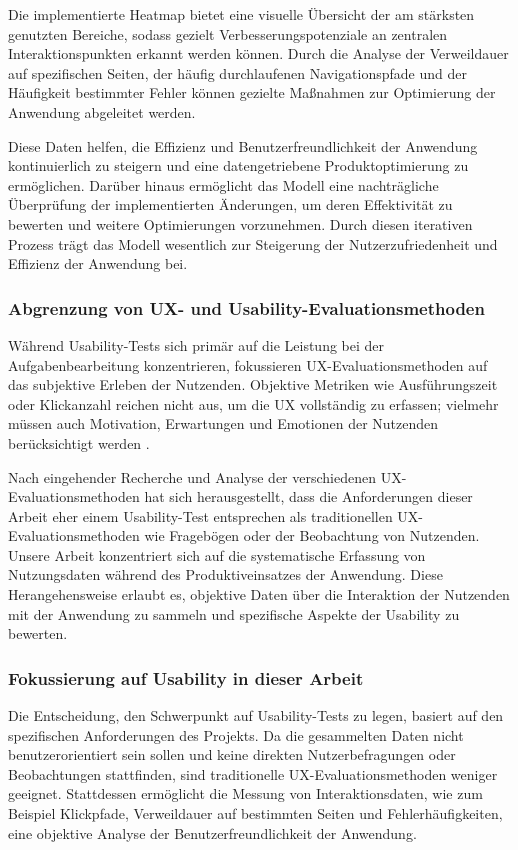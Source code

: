 \documentclass[12pt,oneside]{article}
\begin{document}
Die implementierte Heatmap bietet eine visuelle Übersicht der am stärksten genutzten Bereiche, sodass gezielt Verbesserungspotenziale an zentralen Interaktionspunkten erkannt werden können. Durch die Analyse der Verweildauer auf spezifischen Seiten, der häufig durchlaufenen Navigationspfade und der Häufigkeit bestimmter Fehler können gezielte Maßnahmen zur Optimierung der Anwendung abgeleitet werden.

Diese Daten helfen, die Effizienz und Benutzerfreundlichkeit der Anwendung kontinuierlich zu steigern und eine datengetriebene Produktoptimierung zu ermöglichen. Darüber hinaus ermöglicht das Modell eine nachträgliche Überprüfung der implementierten Änderungen, um deren Effektivität zu bewerten und weitere Optimierungen vorzunehmen. Durch diesen iterativen Prozess trägt das Modell wesentlich zur Steigerung der Nutzerzufriedenheit und Effizienz der Anwendung bei.

\subsubsection{Abgrenzung von UX- und Usability-Evaluationsmethoden}
Während Usability-Tests sich primär auf die Leistung bei der Aufgabenbearbeitung konzentrieren, fokussieren UX-Evaluationsmethoden auf das subjektive Erleben der Nutzenden. Objektive Metriken wie Ausführungszeit oder Klickanzahl reichen nicht aus, um die UX vollständig zu erfassen; vielmehr müssen auch Motivation, Erwartungen und Emotionen der Nutzenden berücksichtigt werden \cite{dev}.

Nach eingehender Recherche und Analyse der verschiedenen UX-Evaluationsmethoden hat sich herausgestellt, dass die Anforderungen dieser Arbeit eher einem Usability-Test entsprechen als traditionellen UX-Evaluationsmethoden wie Fragebögen oder der Beobachtung von Nutzenden. Unsere Arbeit konzentriert sich auf die systematische Erfassung von Nutzungsdaten während des Produktiveinsatzes der Anwendung. Diese Herangehensweise erlaubt es, objektive Daten über die Interaktion der Nutzenden mit der Anwendung zu sammeln und spezifische Aspekte der Usability zu bewerten.
\subsubsection{Fokussierung auf Usability in dieser Arbeit}
Die Entscheidung, den Schwerpunkt auf Usability-Tests zu legen, basiert auf den spezifischen Anforderungen des Projekts. Da die gesammelten Daten nicht benutzerorientiert sein sollen und keine direkten Nutzerbefragungen oder Beobachtungen stattfinden, sind traditionelle UX-Evaluationsmethoden weniger geeignet. Stattdessen ermöglicht die Messung von Interaktionsdaten, wie zum Beispiel Klickpfade, Verweildauer auf bestimmten Seiten und Fehlerhäufigkeiten, eine objektive Analyse der Benutzerfreundlichkeit der Anwendung.
\end{document}
